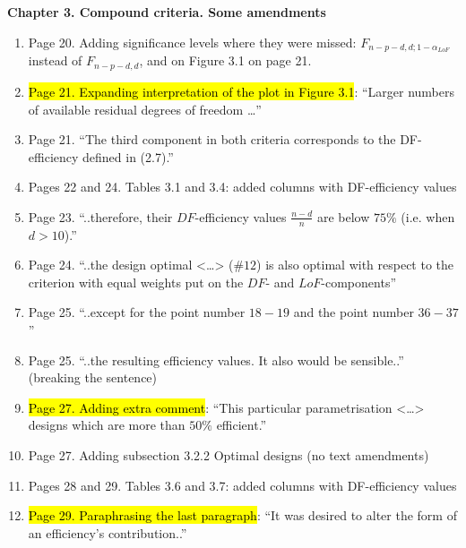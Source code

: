 \documentclass[11pt,a4paper,oneside]{article}
\begin{document}
\textbf{Chapter 3. Compound criteria. Some amendments}
\begin{enumerate}
\item Page 20. Adding significance levels where they were missed: $F_{n-p-d,d;1-\alpha_{LoF}}$ instead of $F_{n-p-d,d}$, and on Figure 3.1 on page 21.
\item \hl{Page 21. Expanding interpretation of the plot in Figure 3.1}: ``Larger numbers of available residual degrees of freedom \ldots'' 
\item Page 21. ``The third component in both criteria corresponds to the DF-efficiency defined in (2.7).''
\item Pages 22 and 24. Tables 3.1 and 3.4: added columns with DF-efficiency values
\item Page 23. ``..therefore, their $DF$-efficiency values $\frac{n-d}{n}$ are below $75\%$ (i.e. when $d>10$).'' 
\item Page 24. ``..the design optimal <\ldots> (\#$12$) is also optimal with respect to the criterion with equal weights put on the $DF$- and $LoF$-components'' 
\item Page 25. ``..except for the point number $18-19$ and the point number $36-37$''
\item Page 25. ``..the resulting efficiency values. It also would be sensible..'' (breaking the sentence)
\item \hl{Page 27. Adding extra comment}: ``This particular parametrisation <\ldots> designs which are more than $50\%$ efficient.''
\item Page 27. Adding subsection 3.2.2 Optimal designs (no text amendments)
\item Pages 28 and 29.  Tables 3.6 and 3.7: added columns with DF-efficiency values
\item \hl{Page 29. Paraphrasing the last paragraph}: ``It was desired to alter the form of an efficiency's contribution..''
\end{enumerate}
\end{document}
